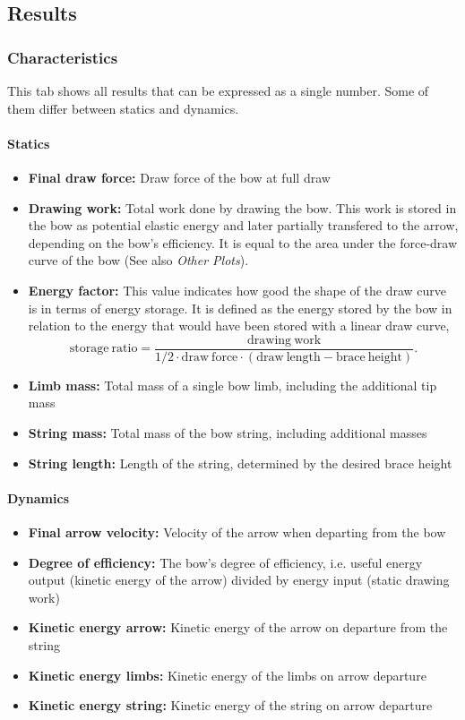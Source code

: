 \documentclass[12pt]{article}
\begin{document}
\newpage
\subsection{Results}

\subsubsection{Characteristics}

This tab shows all results that can be expressed as a single number.
Some of them differ between statics and dynamics.

\paragraph*{Statics}

\begin{itemize}
\item \textbf{Final draw force:} Draw force of the bow at full draw
\item \textbf{Drawing work:} Total work done by drawing the bow. This work is stored in the bow as potential elastic energy and later partially transfered to the arrow, depending on the bow's efficiency. It is equal to the area under the force-draw curve of the bow (See also \textit{Other Plots}).
    \item \textbf{Energy factor:} This value indicates how good the shape of the draw curve is in terms of energy storage.
It is defined as the energy stored by the bow in relation to the energy that would have been stored with a linear draw curve,
$$\mathrm{storage\ ratio} = \frac{\mathrm{drawing\ work}}{1/2\cdot \mathrm{draw\ force}\cdot (\mathrm{draw\ length} - \mathrm{brace\ height})}.$$
\item \textbf{Limb mass:} Total mass of a single bow limb, including the additional tip mass
\item \textbf{String mass:}  Total mass of the bow string, including additional masses
\item \textbf{String length:} Length of the string, determined by the desired brace height
\end{itemize}

\paragraph*{Dynamics}

\begin{itemize}
\item \textbf{Final arrow velocity:} Velocity of the arrow when departing from the bow
\item \textbf{Degree of efficiency:} The bow's degree of efficiency, i.e. useful energy output (kinetic energy of the arrow) divided by energy input (static drawing work)
\item \textbf{Kinetic energy arrow:} Kinetic energy of the arrow on departure from the string
\item \textbf{Kinetic energy limbs:} Kinetic energy of the limbs on arrow departure
\item \textbf{Kinetic energy string:} Kinetic energy of the string on arrow departure
\end{itemize}
\end{document}
